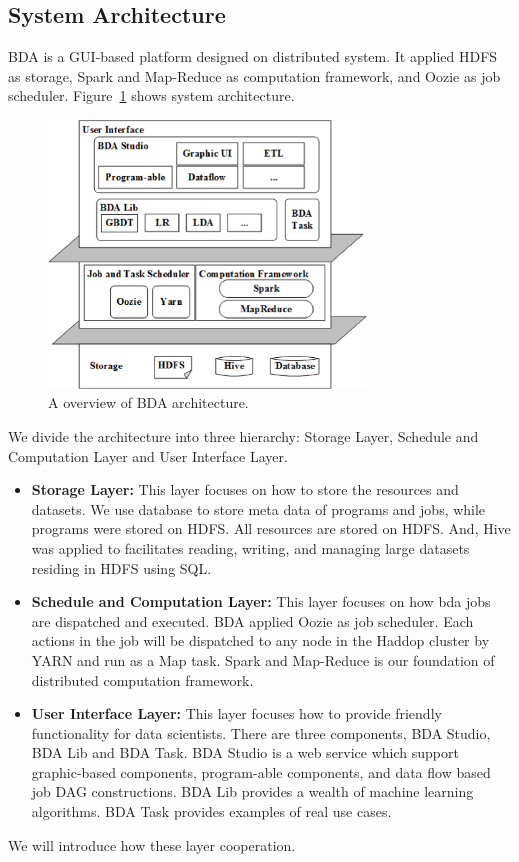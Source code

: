 \documentclass{sig-alternate-05-2015}
\begin{document}
\subsection{System Architecture}
BDA is a GUI-based platform designed on distributed system. It applied HDFS as storage, Spark and Map-Reduce as computation framework, and Oozie as job scheduler. Figure~\ref{fig:arch} shows system architecture.

\begin{figure}
\centering
\includegraphics[height=2.8in]{cikm-architecture.eps}
\caption{ A overview of BDA architecture.}
\label{fig:arch}
\end{figure}

We divide the architecture into three hierarchy: Storage Layer, Schedule and Computation Layer and User Interface Layer.
\begin{itemize}
\item \textbf{Storage Layer:} This layer focuses on how to store the resources and datasets. We use database to store meta data of programs and jobs, while programs were stored on HDFS. All resources are stored on HDFS. And, Hive was applied to facilitates reading, writing, and managing large datasets residing in HDFS using SQL.
\item \textbf{Schedule and Computation Layer:} This layer focuses on how bda jobs are dispatched and executed. BDA applied Oozie as job scheduler. Each actions in the job will be dispatched to any node in the Haddop cluster by YARN and run as a Map task. Spark and Map-Reduce is our foundation of distributed computation framework.
\item \textbf{User Interface Layer:} This layer focuses how to provide friendly functionality for data scientists. There are three components, BDA Studio, BDA Lib and BDA Task. BDA Studio is a web service which support graphic-based components, program-able components, and data flow based job DAG constructions. BDA Lib provides a wealth of machine learning algorithms. BDA Task provides examples of real use cases.
\end{itemize}
We will introduce how these layer cooperation.
\end{document}
